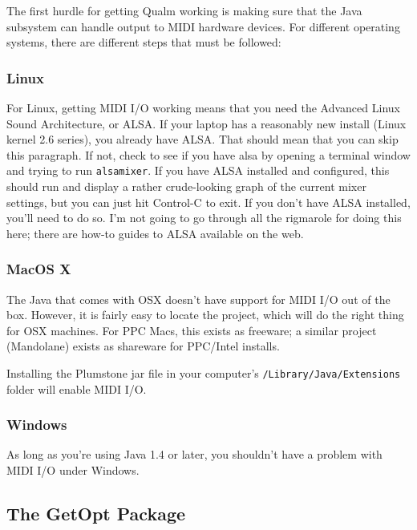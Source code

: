 \documentclass{article}
\newcommand{\q}{{\textsf{Qualm}}\xspace}
\newcommand{\code}[1]{{\tt #1}}
\begin{document}
The first hurdle for getting \q working is making sure that the Java
subsystem can handle output to MIDI hardware devices.  For different
operating systems, there are different steps that must be followed:

\subsubsection{Linux}

For Linux, getting MIDI I/O working means that you need the Advanced
Linux Sound Architecture, or ALSA.  If your laptop has a reasonably
new install (Linux kernel 2.6 series), you already have ALSA.  That
should mean that you can skip this paragraph.  If not, check to see if
you have alsa by opening a terminal window and trying to run
\code{alsamixer}.  If you have ALSA installed and configured, this
should run and display a rather crude-looking graph of the current
mixer settings, but you can just hit Control-C to exit.  If you don't
have ALSA installed, you'll need to do so.  I'm not going to go
through all the rigmarole for doing this here; there are how-to guides
to ALSA available on the web.

\subsubsection{MacOS X}

The Java that comes with OSX doesn't have support for MIDI I/O out of
the box.  However, it is fairly easy to locate the
 project, which will
do the right thing for OSX machines.  For PPC Macs, this exists as
freeware; a similar project (Mandolane) exists as shareware for
PPC/Intel installs.

Installing the Plumstone jar file in your computer's
\code{/Li\-bra\-ry/Ja\-va/Ex\-ten\-sions} folder will enable MIDI I/O.

\subsubsection{Windows}

As long as you're using Java 1.4 or later, you shouldn't have a
problem with MIDI I/O under Windows.

\subsection{The GetOpt Package}
\end{document}
